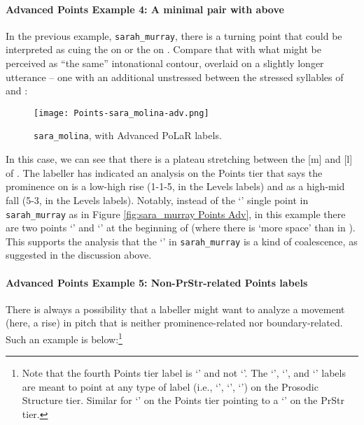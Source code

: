 \paragraph{Advanced Points Example 4: A minimal pair with above}
In the previous example, \texttt{sarah\_murray}, there is a turning point that could be interpreted as cuing the \textlabel{*} on  or the \textlabel{*} on . Compare that with what might be perceived as “the same” intonational contour, overlaid on a slightly longer utterance – one with an additional unstressed between the stressed syllables of  and :

\begin{figure}[H]
\centering
%
\texttt{[image: Points-sara\_molina-adv.png]}
%
\caption{\texttt{sara\_molina}, with Advanced PoLaR labels.%
\label{fig:sara_molina Points Adv}%
}
\end{figure}

In this case, we can see that there is a plateau stretching between the [m] and [l] of . The labeller has indicated an analysis on the Points tier that says the prominence on  is a low-high rise (1-1-5, in the Levels labels) and  as a high-mid fall (5-3, in the Levels labels). Notably, instead of the ‘\textlabel{*</*>}’ single point in \texttt{sarah\_murray} as in Figure \ref{fig:sara_murray Points Adv}, in this example there are two points ‘\textlabel{*<}’ and ‘\textlabel{*>}’ at the beginning of  (where there is ‘more space’ than in ). This supports the analysis that the ‘\textlabel{*</*>}’ in \texttt{sarah\_murray} is a kind of coalescence, as suggested in the discussion above.

\paragraph{Advanced Points Example 5: Non-PrStr-related Points labels}
There is always a possibility that a labeller might want to analyze a movement (here, a rise) in pitch that is neither prominence-related nor boundary-related. Such an example is below:\footnote{Note that the fourth Points tier label is ‘’ and not ‘’. The ‘’, ‘\textlabel{*<}’, and ‘\textlabel{*>}’ labels are meant to point at any type of \textlabel{*} label (i.e., ‘\textlabel{*}’, ‘\textlabel{**}’, ‘’) on the Prosodic Structure tier. Similar for ‘\textlabel{]>}’ on the Points tier pointing to a ‘\textlabel{]]}’ on the PrStr tier.}

